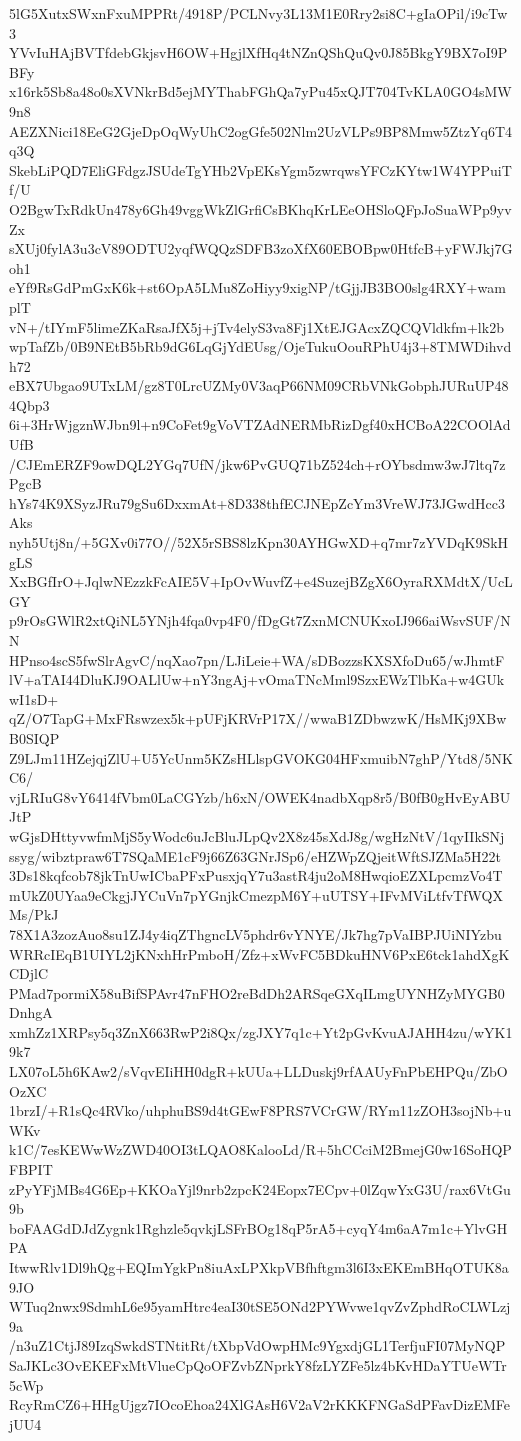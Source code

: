5lG5XutxSWxnFxuMPPRt/4918P/PCLNvy3L13M1E0Rry2si8C+gIaOPil/i9cTw3
YVvIuHAjBVTfdebGkjsvH6OW+HgjlXfHq4tNZnQShQuQv0J85BkgY9BX7oI9PBFy
x16rk5Sb8a48o0sXVNkrBd5ejMYThabFGhQa7yPu45xQJT704TvKLA0GO4sMW9n8
AEZXNici18EeG2GjeDpOqWyUhC2ogGfe502Nlm2UzVLPs9BP8Mmw5ZtzYq6T4q3Q
SkebLiPQD7EliGFdgzJSUdeTgYHb2VpEKsYgm5zwrqwsYFCzKYtw1W4YPPuiTf/U
O2BgwTxRdkUn478y6Gh49vggWkZlGrfiCsBKhqKrLEeOHSloQFpJoSuaWPp9yvZx
sXUj0fylA3u3cV89ODTU2yqfWQQzSDFB3zoXfX60EBOBpw0HtfcB+yFWJkj7Goh1
eYf9RsGdPmGxK6k+st6OpA5LMu8ZoHiyy9xigNP/tGjjJB3BO0slg4RXY+wamplT
vN+/tIYmF5limeZKaRsaJfX5j+jTv4elyS3va8Fj1XtEJGAcxZQCQVldkfm+lk2b
wpTafZb/0B9NEtB5bRb9dG6LqGjYdEUsg/OjeTukuOouRPhU4j3+8TMWDihvdh72
eBX7Ubgao9UTxLM/gz8T0LrcUZMy0V3aqP66NM09CRbVNkGobphJURuUP484Qbp3
6i+3HrWjgznWJbn9l+n9CoFet9gVoVTZAdNERMbRizDgf40xHCBoA22COOlAdUfB
/CJEmERZF9owDQL2YGq7UfN/jkw6PvGUQ71bZ524ch+rOYbsdmw3wJ7ltq7zPgcB
hYs74K9XSyzJRu79gSu6DxxmAt+8D338thfECJNEpZcYm3VreWJ73JGwdHcc3Aks
nyh5Utj8n/+5GXv0i77O//52X5rSBS8lzKpn30AYHGwXD+q7mr7zYVDqK9SkHgLS
XxBGfIrO+JqlwNEzzkFcAIE5V+IpOvWuvfZ+e4SuzejBZgX6OyraRXMdtX/UcLGY
p9rOsGWlR2xtQiNL5YNjh4fqa0vp4F0/fDgGt7ZxnMCNUKxoIJ966aiWsvSUF/NN
HPnso4scS5fwSlrAgvC/nqXao7pn/LJiLeie+WA/sDBozzsKXSXfoDu65/wJhmtF
lV+aTAI44DluKJ9OALlUw+nY3ngAj+vOmaTNcMml9SzxEWzTlbKa+w4GUkwI1sD+
qZ/O7TapG+MxFRswzex5k+pUFjKRVrP17X//wwaB1ZDbwzwK/HsMKj9XBwB0SIQP
Z9LJm11HZejqjZlU+U5YcUnm5KZsHLlspGVOKG04HFxmuibN7ghP/Ytd8/5NKC6/
vjLRIuG8vY6414fVbm0LaCGYzb/h6xN/OWEK4nadbXqp8r5/B0fB0gHvEyABUJtP
wGjsDHttyvwfmMjS5yWodc6uJcBluJLpQv2X8z45sXdJ8g/wgHzNtV/1qyIIkSNj
ssyg/wibztpraw6T7SQaME1cF9j66Z63GNrJSp6/eHZWpZQjeitWftSJZMa5H22t
3Ds18kqfcob78jkTnUwICbaPFxPusxjqY7u3astR4ju2oM8HwqioEZXLpcmzVo4T
mUkZ0UYaa9eCkgjJYCuVn7pYGnjkCmezpM6Y+uUTSY+IFvMViLtfvTfWQXMs/PkJ
78X1A3zozAuo8su1ZJ4y4iqZThgncLV5phdr6vYNYE/Jk7hg7pVaIBPJUiNIYzbu
WRRcIEqB1UIYL2jKNxhHrPmboH/Zfz+xWvFC5BDkuHNV6PxE6tck1ahdXgKCDjlC
PMad7pormiX58uBifSPAvr47nFHO2reBdDh2ARSqeGXqILmgUYNHZyMYGB0DnhgA
xmhZz1XRPsy5q3ZnX663RwP2i8Qx/zgJXY7q1c+Yt2pGvKvuAJAHH4zu/wYK19k7
LX07oL5h6KAw2/sVqvEIiHH0dgR+kUUa+LLDuskj9rfAAUyFnPbEHPQu/ZbOOzXC
1brzI/+R1sQc4RVko/uhphuBS9d4tGEwF8PRS7VCrGW/RYm11zZOH3sojNb+uWKv
k1C/7esKEWwWzZWD40OI3tLQAO8KalooLd/R+5hCCciM2BmejG0w16SoHQPFBPIT
zPyYFjMBs4G6Ep+KKOaYjl9nrb2zpcK24Eopx7ECpv+0lZqwYxG3U/rax6VtGu9b
boFAAGdDJdZygnk1Rghzle5qvkjLSFrBOg18qP5rA5+cyqY4m6aA7m1c+YlvGHPA
ItwwRlv1Dl9hQg+EQImYgkPn8iuAxLPXkpVBfhftgm3l6I3xEKEmBHqOTUK8a9JO
WTuq2nwx9SdmhL6e95yamHtrc4eaI30tSE5ONd2PYWvwe1qvZvZphdRoCLWLzj9a
/n3uZ1CtjJ89IzqSwkdSTNtitRt/tXbpVdOwpHMc9YgxdjGL1TerfjuFI07MyNQP
SaJKLc3OvEKEFxMtVlueCpQoOFZvbZNprkY8fzLYZFe5lz4bKvHDaYTUeWTr5cWp
RcyRmCZ6+HHgUjgz7IOcoEhoa24XlGAsH6V2aV2rKKKFNGaSdPFavDizEMFejUU4
